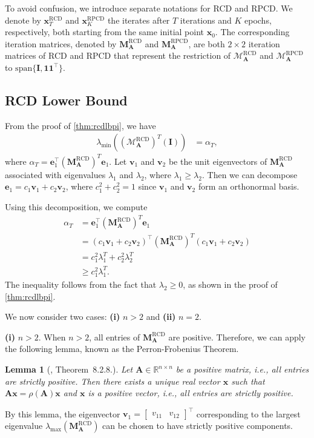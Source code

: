 \documentclass{article}
\theoremstyle{plain}
\newtheorem{lemma}[theorem]{Lemma}
\theoremstyle{definition}
\theoremstyle{remark}
\def\bigopen#1{\left(#1\right)}
\renewcommand{\sp}{\mathrm{span}}
\newcommand{\RCD}{\text{RCD}} %
\newcommand{\RPCD}{\text{RPCD}} %
\newcommand{\MARCD}{\mathcal{M}_{\bm{A}}^{\RCD}} %
\newcommand{\MARPCD}{\mathcal{M}_{\bm{A}}^{\RPCD}} %
\def\vone{{\bm{1}}}
\def\ve{{\bm{e}}}
\def\vv{{\bm{v}}}
\def\vx{{\bm{x}}}
\def\mA{{\bm{A}}}
\def\mI{{\bm{I}}}
\def\mM{{\bm{M}}}
\begin{document}
To avoid confusion, we introduce separate notations for RCD and RPCD. We denote by $\vx_T^{\RCD}$ and $\vx_K^{\RPCD}$ the iterates after $T$ iterations and $K$ epochs, respectively, both starting from the same initial point $\vx_0$. The corresponding iteration matrices, denoted by $\mM_{\mA}^{\RCD}$ and $\mM_{\mA}^{\RPCD}$, are both $2 \times 2$ iteration matrices of RCD and RPCD that represent the restriction of $\MARCD$ and $\MARPCD$ to $\sp\{\mI, \vone \vone^{\top}\}$.

\subsection{RCD Lower Bound}

From the proof of \cref{thm:rcdlbpi}, we have
\begin{align*}
    \lambda_{\min}((\MARCD)^T(\mI)) &= \alpha_T,
\end{align*}
where $\alpha_T = \ve_1^{\top} (\mM_{\mA}^{\RCD})^T \ve_1$. Let $\vv_1$ and $\vv_2$ be the unit eigenvectors of $\mM_{\mA}^{\RCD}$ associated with eigenvalues $\lambda_1$ and $\lambda_2$, where $\lambda_1 \ge \lambda_2$. Then we can decompose $\ve_1 = c_1 \vv_1 + c_2 \vv_2$, where $c_1^2 + c_2^2 = 1$ since $\vv_1$ and $\vv_2$ form an orthonormal basis.

Using this decomposition, we compute
\begin{align*}
    \alpha_T &= \ve_1^{\top} (\mM_{\mA}^{\RCD})^T \ve_1 \\
    &= \bigopen{c_1 \vv_1 + c_2 \vv_2}^{\top} (\mM_{\mA}^{\RCD})^T \bigopen{c_1 \vv_1 + c_2 \vv_2} \\
    &= c_1^2 \lambda_1^T + c_2^2 \lambda_2^T \\
    &\ge c_1^2 \lambda_1^T.
\end{align*}
The inequality follows from the fact that $\lambda_2 \ge 0$, as shown in the proof of \cref{thm:rcdlbpi}.

We now consider two cases: \textbf{(i)} $n>2$ and \textbf{(ii)} $n=2$.

\textbf{(i)} $n>2$. When $n > 2$, all entries of $\mM_{\mA}^{\RCD}$ are positive. Therefore, we can apply the following lemma, known as the Perron-Frobenius Theorem. 
\begin{lemma}[\citet{horn2012}, Theorem~8.2.8.]
    \label{lem:perronfrob}
    Let $\mA \in \mathbb{R}^{n \times n}$ be a positive matrix, i.e., all entries are strictly positive. Then there exists a unique real vector $\vx$ such that $\mA \vx = \rho(\mA) \vx$ and $\vx$ is a positive vector, i.e., all entries are strictly positive.
\end{lemma}
By this lemma, the eigenvector $\vv_1 = \begin{bmatrix} v_{11} & v_{12} \end{bmatrix}^\top$ corresponding to the largest eigenvalue $\lambda_{\max}(\mM_{\mA}^{\RCD})$ can be chosen to have strictly positive components.
\end{document}
